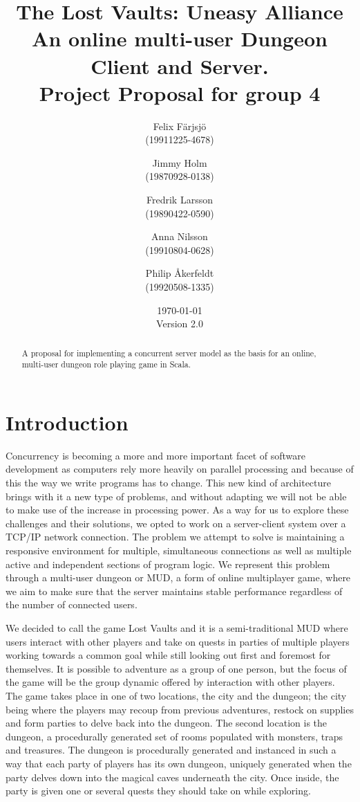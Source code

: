 \documentclass[a4paper]{article}
\title{The Lost Vaults: Uneasy Alliance\\\small{An online multi-user Dungeon Client and Server.}\\\small{Project Proposal for group 4}}
\author{Felix Färjsjö\\(19911225-4678) \and Jimmy Holm\\(19870928-0138) \and Fredrik Larsson\\(19890422-0590) \and Anna Nilsson\\(19910804-0628) \and Philip Åkerfeldt\\(19920508-1335)}
\date{\today\\Version 2.0}
\begin{document}
\maketitle
\newpage
\begin{abstract}
A proposal for implementing a concurrent server model as the basis for an online, multi-user dungeon role playing game in Scala.
\end{abstract}

\tableofcontents
\listoffigures
\newpage
\section{Introduction}
Concurrency is becoming a more and more important facet of software development as computers rely more heavily on parallel processing and because of this the way we write programs has to change. 
This new kind of architecture brings with it a new type of problems, and without adapting we will not be able to make use of the increase in processing power. 
As a way for us to explore these challenges and their solutions, we opted to work on a server-client system over a TCP/IP network connection. The problem we attempt to solve is maintaining a responsive 
environment for multiple, simultaneous connections as well as multiple active and independent sections of program logic. We represent this problem through a multi-user dungeon or 
MUD, a form of online multiplayer game, where we aim to make sure that the server maintains stable performance regardless of the number of connected users.

We decided to call the game Lost Vaults and it is a semi-traditional MUD where users interact with other players and take on quests in parties 
of multiple players working towards a common goal while still looking out first and foremost for themselves. It is possible to adventure as a group of one person, but the focus of the 
game will be the group dynamic offered by interaction with other players. 
The game takes place in one of two locations, the city and the dungeon; the city being where the players may recoup from previous adventures, restock on supplies and 
form parties to delve back into the dungeon. The second location is the dungeon, a procedurally generated set of rooms populated with monsters, traps and treasures.
The dungeon is procedurally generated and instanced in such a way that each party of players has its own dungeon, uniquely generated when the party delves down into 
the magical caves underneath the city. Once inside, the party is given one or several quests they should take on while exploring.
\end{document}
